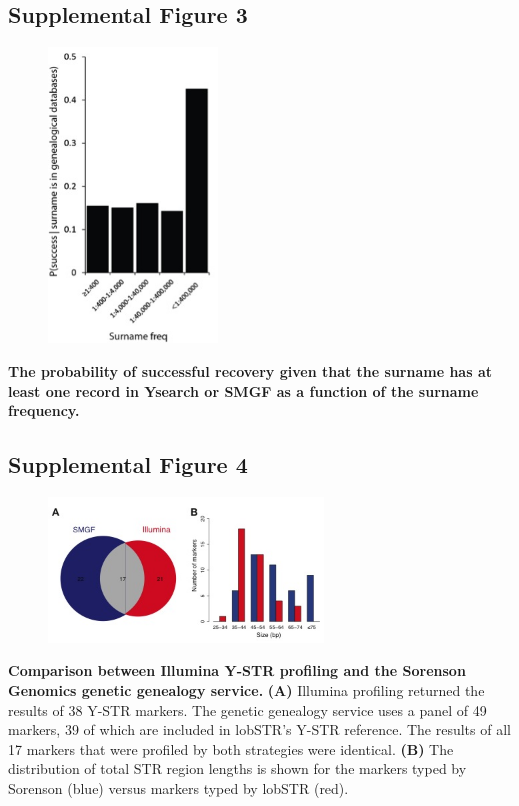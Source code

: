 \pagebreak
\subsection{Supplemental Figure 3}
\begin{figure}[h!]
\centering
\label{fig:sursup3}
\includegraphics[width=0.4\textwidth]{Figures/App1/SuppFig3.jpg}
\end{figure}
\textbf{The probability of successful recovery given that the surname has at least one record in Ysearch or SMGF as a function of the surname frequency.}

\pagebreak
\subsection{Supplemental Figure 4}
\begin{figure}[h!]
\centering
\label{fig:sursup4}
\includegraphics[width=0.65\textwidth]{Figures/App1/SuppFig4.jpg}
\end{figure}
\textbf{Comparison between Illumina Y-STR profiling and the Sorenson Genomics genetic genealogy service.} \textbf{(A)} Illumina profiling returned the results of 38 Y-STR markers. The genetic genealogy service uses a panel of 49 markers, 39 of which are included in lobSTR’s Y-STR reference. The results of all 17 markers that were profiled by both strategies were identical. \textbf{(B)} The distribution of total STR region lengths is shown for the markers typed by Sorenson (blue) versus markers typed by lobSTR (red).

